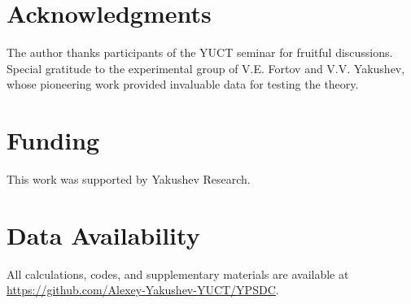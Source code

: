 \documentclass[12pt,a4paper]{article}
\theoremstyle{remark}
\begin{document}
	
	\section*{Acknowledgments}
	
	The author thanks participants of the YUCT seminar for fruitful discussions. Special gratitude to the experimental group of V.E. Fortov and V.V. Yakushev, whose pioneering work provided invaluable data for testing the theory.
	
	\section*{Funding}
	
	This work was supported by Yakushev Research.
	
	\section*{Data Availability}
	
	All calculations, codes, and supplementary materials are available at \url{https://github.com/Alexey-Yakushev-YUCT/YPSDC}.
	
\end{document}
